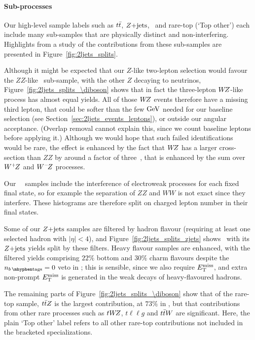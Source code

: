 \paragraph{Sub-processes}
Our high-level sample labels such as $\ttbar$, $\zjets$, \diboson\ and
rare-top (`Top other') each include many sub-samples that are physically
distinct and non-interfering.
Highlights from a study of the contributions from these sub-samples are
presented in Figure~\ref{fig:2ljets_splits}.

Although it might be expected that our $Z$-like two-lepton selection would
favour the $ZZ$-like \diboson\ sub-sample, with the other $Z$ decaying to
neutrinos,
Figure~\ref{fig:2ljets_splits_\diboson} shows that in fact the three-lepton
$W\kern-0.4exZ$-like process has almost equal yields.
All of those $W\kern-0.4exZ$ events therefore have a missing third lepton, that could be
softer than the few $\eV[G]$ needed for our baseline selection
(see Section~\ref{sec:2ljets_events_leptons}),
or outside our angular acceptance.
(Overlap removal cannot explain this, since we count baseline leptons before
applying it.)
Although we would hope that such failed identifications would be rare,
the effect is enhanced by the fact that $W\kern-0.4exZ$ has a larger cross-section than
$ZZ$ by around a factor of three~\cite{Campbell:2011bn}, that is enhanced
by the sum over $W^+\kern-0.4exZ$ and $W^-\kern-0.4exZ$ processes.

Our \sherpa\ \diboson\ samples include the interference of electroweak processes
for each fixed final state, so for example the separation of $ZZ$ and $WW$ is
not exact since they interfere.
These histograms are therefore split on charged lepton number in their
final states.

Some of our $\zjets$ samples are filtered by hadron flavour
(requiring at least one selected hadron with $|\eta| < 4$), and
Figure~\ref{fig:2ljets_splits_zjets} shows \crz\ with its $\zjets$ yields
split by these filters.
Heavy flavour samples are enhanced, with the filtered yields comprising
$22\%$ bottom and $30\%$ charm flavours despite the $\nbtag = 0$ veto in \crz;
this is sensible, since we also require $\met$, and extra non-prompt $\met$ is
generated  in the weak decays of heavy-flavoured hadrons.

The remaining parts of Figure~\ref{fig:2ljets_splits_\diboson} show that
of the rare-top sample, $\ttbar Z$ is the largest contribution,
at $73\%$ in \srllbb, but that contributions from other rare processes
such as $tW\kern-0.4exZ$, $t\ell\ell g$ and $\ttbar W$ are significant.
Here, the plain `Top other' label refers to all other rare-top contributions
not included in the bracketed specializations.

